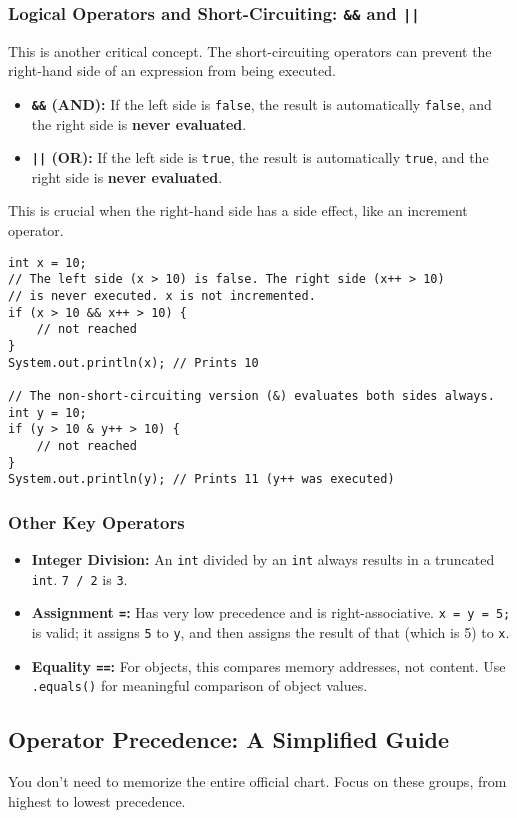 \documentclass[12pt]{article}
\begin{document}
\begin{enumerate}[label=(\arabic*)]
\subsubsection*{Logical Operators and Short-Circuiting: \texttt{\&\&} and \texttt{||}}
This is another critical concept. The short-circuiting operators can prevent the right-hand side of an expression from being executed.
\begin{itemize}
    \item \textbf{\texttt{\&\&} (AND):} If the left side is \texttt{false}, the result is automatically \texttt{false}, and the right side is \textbf{never evaluated}.
    \item \textbf{\texttt{||} (OR):} If the left side is \texttt{true}, the result is automatically \texttt{true}, and the right side is \textbf{never evaluated}.
\end{itemize}
This is crucial when the right-hand side has a side effect, like an increment operator.
\begin{verbatim}
int x = 10;
// The left side (x > 10) is false. The right side (x++ > 10)
// is never executed. x is not incremented.
if (x > 10 && x++ > 10) {
    // not reached
}
System.out.println(x); // Prints 10

// The non-short-circuiting version (&) evaluates both sides always.
int y = 10;
if (y > 10 & y++ > 10) {
    // not reached
}
System.out.println(y); // Prints 11 (y++ was executed)
\end{verbatim}

\subsubsection*{Other Key Operators}
\begin{itemize}
    \item \textbf{Integer Division:} An \texttt{int} divided by an \texttt{int} always results in a truncated \texttt{int}. \texttt{7 / 2} is \texttt{3}.
    \item \textbf{Assignment \texttt{=}:} Has very low precedence and is right-associative. \texttt{x = y = 5;} is valid; it assigns \texttt{5} to \texttt{y}, and then assigns the result of that (which is 5) to \texttt{x}.
    \item \textbf{Equality \texttt{==}:} For objects, this compares memory addresses, not content. Use \texttt{.equals()} for meaningful comparison of object values.
\end{itemize}

\subsection*{Operator Precedence: A Simplified Guide}
You don't need to memorize the entire official chart. Focus on these groups, from highest to lowest precedence.


\end{enumerate}
\end{document}
